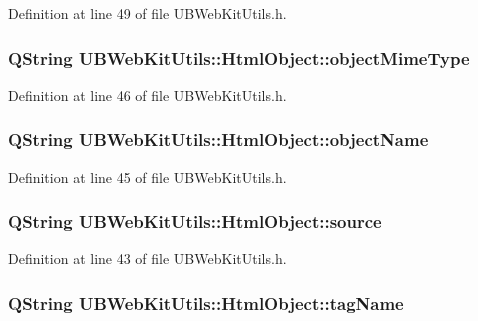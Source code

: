 Definition at line 49 of file U\-B\-Web\-Kit\-Utils.\-h.

\hypertarget{class_u_b_web_kit_utils_1_1_html_object_ac53f32b83e74f048835b2723056173c6}{
\subsubsection[{object\-Mime\-Type}]{\setlength{\rightskip}{0pt plus 5cm}Q\-String U\-B\-Web\-Kit\-Utils\-::\-Html\-Object\-::object\-Mime\-Type}}\label{dc/d35/class_u_b_web_kit_utils_1_1_html_object_ac53f32b83e74f048835b2723056173c6}


Definition at line 46 of file U\-B\-Web\-Kit\-Utils.\-h.

\hypertarget{class_u_b_web_kit_utils_1_1_html_object_a8d8b936f8349cc92419093e6a986a26c}{
\subsubsection[{object\-Name}]{\setlength{\rightskip}{0pt plus 5cm}Q\-String U\-B\-Web\-Kit\-Utils\-::\-Html\-Object\-::object\-Name}}\label{dc/d35/class_u_b_web_kit_utils_1_1_html_object_a8d8b936f8349cc92419093e6a986a26c}


Definition at line 45 of file U\-B\-Web\-Kit\-Utils.\-h.

\hypertarget{class_u_b_web_kit_utils_1_1_html_object_ab9e5845849472ea4e82b8a9b685edefb}{
\subsubsection[{source}]{\setlength{\rightskip}{0pt plus 5cm}Q\-String U\-B\-Web\-Kit\-Utils\-::\-Html\-Object\-::source}}\label{dc/d35/class_u_b_web_kit_utils_1_1_html_object_ab9e5845849472ea4e82b8a9b685edefb}


Definition at line 43 of file U\-B\-Web\-Kit\-Utils.\-h.

\hypertarget{class_u_b_web_kit_utils_1_1_html_object_ae5d04882c6f4374569abb0265e993fdd}{
\subsubsection[{tag\-Name}]{\setlength{\rightskip}{0pt plus 5cm}Q\-String U\-B\-Web\-Kit\-Utils\-::\-Html\-Object\-::tag\-Name}}\label{dc/d35/class_u_b_web_kit_utils_1_1_html_object_ae5d04882c6f4374569abb0265e993fdd}


